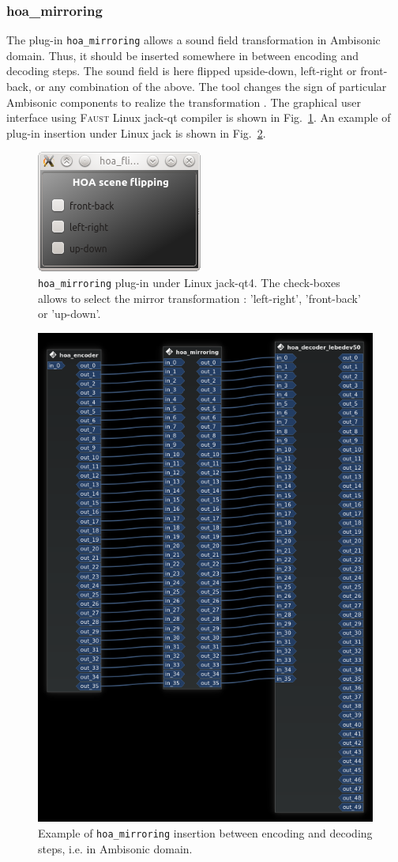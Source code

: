 \documentclass[10pt,a4paper]{article}
\begin{document}
\subsubsection{hoa\_mirroring}
The plug-in \lstinline'hoa_mirroring' allows a sound field transformation in Ambisonic domain. Thus, it should be inserted somewhere in between encoding and decoding steps. The sound field is here flipped upside-down, left-right or front-back, or any combination of the above. The tool changes the sign of particular Ambisonic components to realize the transformation \cite{kronlachner2014spatial}. The graphical user interface using \textsc{Faust} Linux jack-qt compiler is shown in Fig.~\ref{fig:hoa_mirroring}. An example of plug-in insertion under Linux jack is shown in Fig.~\ref{fig:hoa_mirroring_claudia}.
\begin{figure}[!ht]
\centering
\includegraphics[width=0.3\columnwidth]{hoa_mirroring.png}
\caption{\lstinline'hoa_mirroring' plug-in under Linux jack-qt4. The check-boxes allows to select the mirror transformation : 'left-right', 'front-back' or 'up-down'.}
\label{fig:hoa_mirroring}
\end{figure}
\begin{figure}[!ht]
\centering
\includegraphics[width=0.5\columnwidth]{hoa_mirroring_claudia.png}
\caption{Example of \lstinline'hoa_mirroring' insertion between encoding and decoding steps, i.e. in Ambisonic domain.}
\label{fig:hoa_mirroring_claudia}
\end{figure}
\end{document}

